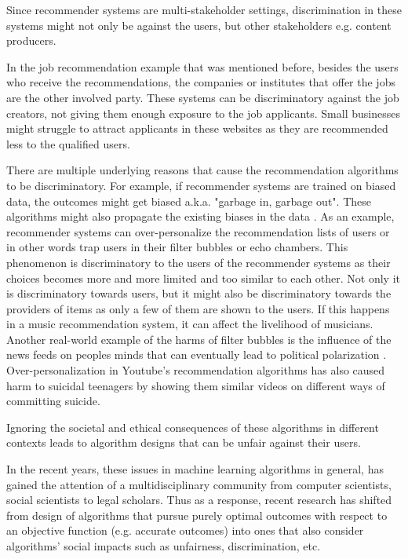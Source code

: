 Since recommender systems are multi-stakeholder settings, discrimination in these systems might not only be against the users, but other stakeholders e.g. content producers. 

In the job recommendation example that was mentioned before, besides the users who receive the recommendations, the companies or institutes that offer the jobs are the other involved party. These systems can be discriminatory against the job creators, not giving them enough exposure to the job applicants. Small businesses might struggle to attract applicants in these websites as they are recommended less to the qualified users.


There are multiple underlying reasons that cause the recommendation algorithms to be discriminatory. For example, if recommender systems are trained on biased data, the outcomes might get biased a.k.a. "garbage in, garbage out". These algorithms might also propagate the existing biases in the data \cite{barocas2016big}. As an example, recommender systems can over-personalize the recommendation lists of users or in other words trap users in their filter bubbles or echo chambers. This phenomenon is discriminatory to the users of the recommender systems as their choices becomes more and more limited and too similar to each other. Not only it is discriminatory towards users, but it might also be discriminatory towards the providers of items as only a few of them are shown to the users. If this happens in a music recommendation system, it can affect the livelihood of musicians. Another real-world example of the harms of filter bubbles is the influence of the news feeds on peoples minds that can eventually lead to political polarization . Over-personalization in Youtube's recommendation algorithms has also caused harm to suicidal teenagers by showing them similar videos on different ways of committing suicide. 

Ignoring the societal and ethical consequences of these algorithms in different contexts leads to algorithm designs that can be unfair against their users.

In the recent years, these issues in machine learning algorithms in general, has gained the attention of a multidisciplinary community from computer scientists, social scientists to legal scholars. Thus as a response, recent research has shifted from design of algorithms that pursue purely optimal outcomes with respect to an objective function (e.g. accurate outcomes) into ones that also consider algorithms' social impacts such as unfairness, discrimination, etc.

